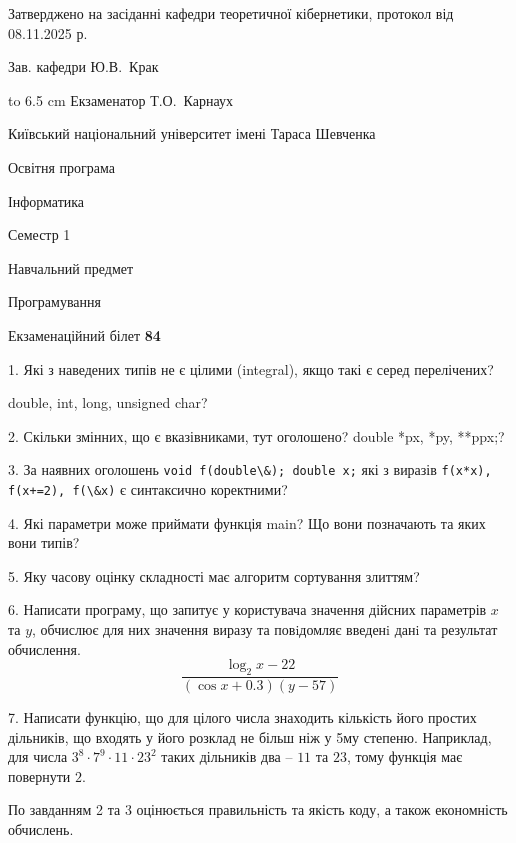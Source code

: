 \documentclass[12pt, ukrainian]{article}
\def\code#1{\Verb!#1!}
\begin{document}
{\smallskip\smallskip \begin {scriptsize} Затверджено на засіданні кафедри теоретичної кібернетики, протокол   від   08.11.2025 р.\par\smallskip\smallskip\smallskip\smallskip
{\parbox {6.5 cm} {Зав. кафедри \dotfill Ю.В.~Крак}}\hspace {0.7cm} {\hbox to 6.5 cm { Екзаменатор \dotfill Т.О.~Карнаух}} \end{scriptsize}}
\vspace{0.9cm}
{{\begin {scriptsize}\par
{ \center  Київський національний університет імені Тараса Шевченка \par}
{\parbox {5 cm}{Освітня програма \hfill}{\parbox {7 cm}{Інформатика\hfill}}\parbox {6 cm}{\hfill Семестр 1}}\par
{\parbox {5 cm} {Навчальний предмет \hfill}\parbox {7 cm}{Програмування \hfill}\parbox {6cm}{\hfill}\par}\vspace{-15pt} \end{scriptsize}}{\center Екзаменаційний білет \No \textbf { 84 }\par}}
{%
1. Які з наведених типів не є цілими (integral), якщо такі є серед перелічених?

double, int, long, unsigned char?
\par
\vspace{2mm}
2. Скільки змінних, що є вказівниками, тут оголошено?
double *px, *py, **ppx;?
\par
\vspace{2mm}
3. За наявних оголошень \code{void f(double\&); double x;} які з виразів \code{f(x*x), f(x+=2), f(\&x)} є синтаксично коректними?
\par
\vspace{2mm}
4. Які параметри може приймати функція main? Що вони позначають та яких вони типів?
\par
\vspace{2mm}
5. Яку часову оцінку складності має алгоритм сортування злиттям?
\par
\vspace{2mm}
6. Написати програму, що запитує у користувача значення дійсних параметрів $x$ та $y$, обчислює для них значення виразу та повiдомляє введенi данi та результат обчислення.
$$\frac{\log_{2} x - 22}{(\cos x + 0.3) (y - 57)}$$ 

\par
7. Написати функцію, що для цілого числа знаходить кількість його простих дільників, що входять у його розклад не більш ніж у 5му степеню. Наприклад, для числа $3^8{\cdot}7^9{\cdot}11{\cdot}23^{2}$ таких дільників два – $11$ та $23$, тому функція має повернути $2$.

По завданням 2 та 3 оцінюється правильність та якість коду, а також економність обчислень.

}
\end{document}
